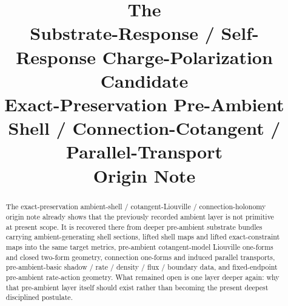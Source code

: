 \documentclass[11pt]{article}
\title{\textbf{The \TheoryName{}}\\[0.4em]
\large Substrate-Response / Self-Response Charge-Polarization Candidate\\
\large Exact-Preservation Pre-Ambient Shell / Connection-Cotangent / Parallel-Transport\\
\large Origin Note}
\author{}
\date{}
\begin{document}
\maketitle

\begin{abstract}
The exact-preservation ambient-shell / cotangent-Liouville / connection-holonomy origin note already shows that the previously recorded ambient layer is not primitive at present scope. It is recovered there from deeper pre-ambient substrate bundles carrying ambient-generating shell sections, lifted shell maps and lifted exact-constraint maps into the same target metrics, pre-ambient cotangent-model Liouville one-forms and closed two-form geometry, connection one-forms and induced parallel transports, pre-ambient-basic shadow / rate / density / flux / boundary data, and fixed-endpoint pre-ambient rate-action geometry. What remained open is one layer deeper again: why that pre-ambient layer itself should exist rather than becoming the present deepest disciplined postulate.


\end{abstract}
\end{document}

